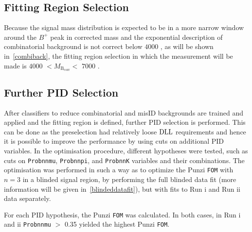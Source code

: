 \subsection{Fitting Region Selection}
\label{fittingsel}

Because the signal mass distribution is expected to be in a more narrow window around the $B^{+}$ peak in corrected mass and the exponential description of combinatorial background is not correct below $4000$ \mevcc, as will be shown in~\autoref{combiback}, the fitting region selection in which the measurement will be made is $4000$ \mevcc $<M_{\mathrm{B_{corr}}}<$ $7000$ \mevcc.

\subsection{Further \gls{PID} Selection}
\label{furtherpid}
After classifiers to reduce combinatorial and misID backgrounds are trained and applied and the fitting region is defined, further \gls{PID} selection is performed. This can be done as the preselection had relatively loose $\rm{DLL}$ requirements and hence it is possible to improve the performance by using cuts on additional \gls{PID} variables. In the optimisation procedure, different hypotheses were tested, such as cuts on \texttt{Probnnmu}, \texttt{Probnnpi}, and \texttt{ProbnnK} variables and their combinations. The optimisation was performed in such a way as to optimize the Punzi \texttt{FOM} with $n=3$ in a blinded signal region, by performing the full blinded data fit (more information will be given in~\autoref{blindeddatafit}), but with fits to Run \Rn{1} and Run \Rn{2} data separately.


For each PID hypothesis, the Punzi \texttt{FOM} was calculated. In both cases, in Run \Rn{1} and \Rn{2} \texttt{Probnnmu} $>$ 0.35 yielded the highest Punzi \texttt{FOM}.







